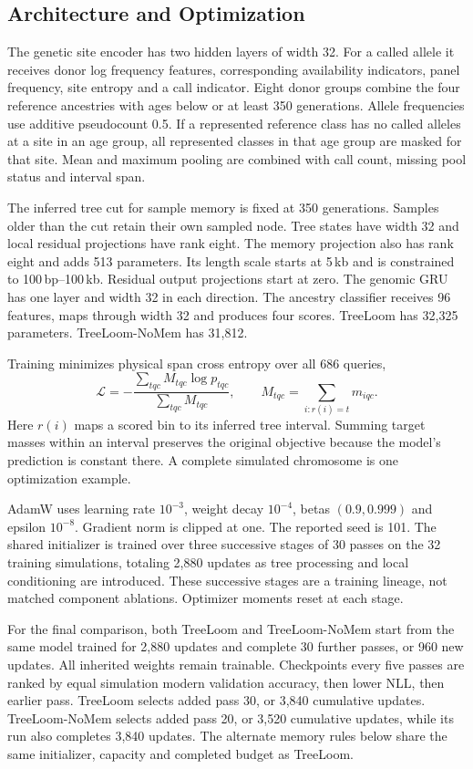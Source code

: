 \documentclass[letterpaper]{article}
\begin{document}
\subsection{Architecture and Optimization}
The genetic site encoder has two hidden layers of width 32. For a called allele it receives donor log frequency features, corresponding availability indicators, panel frequency, site entropy and a call indicator. Eight donor groups combine the four reference ancestries with ages below or at least 350 generations. Allele frequencies use additive pseudocount 0.5. If a represented reference class has no called alleles at a site in an age group, all represented classes in that age group are masked for that site. Mean and maximum pooling are combined with call count, missing pool status and interval span.

The inferred tree cut for sample memory is fixed at 350 generations. Samples older than the cut retain their own sampled node. Tree states have width 32 and local residual projections have rank eight. The memory projection also has rank eight and adds 513 parameters. Its length scale starts at 5\,kb and is constrained to 100\,bp--100\,kb. Residual output projections start at zero. The genomic GRU has one layer and width 32 in each direction. The ancestry classifier receives 96 features, maps through width 32 and produces four scores. TreeLoom has 32,325 parameters. TreeLoom-NoMem has 31,812.

Training minimizes physical span cross entropy over all 686 queries,
\begin{equation}
\mathcal L=
-\frac{\sum_{tqc}M_{tqc}\log p_{tqc}}{\sum_{tqc}M_{tqc}},
\qquad
M_{tqc}=\sum_{i:r(i)=t}m_{iqc}.
\end{equation}
Here $r(i)$ maps a scored bin to its inferred tree interval. Summing target masses within an interval preserves the original objective because the model's prediction is constant there. A complete simulated chromosome is one optimization example.

AdamW uses learning rate $10^{-3}$, weight decay $10^{-4}$, betas $(0.9,0.999)$ and epsilon $10^{-8}$. Gradient norm is clipped at one. The reported seed is 101. The shared initializer is trained over three successive stages of 30 passes on the 32 training simulations, totaling 2,880 updates as tree processing and local conditioning are introduced. These successive stages are a training lineage, not matched component ablations. Optimizer moments reset at each stage.

For the final comparison, both TreeLoom and TreeLoom-NoMem start from the same model trained for 2,880 updates and complete 30 further passes, or 960 new updates. All inherited weights remain trainable. Checkpoints every five passes are ranked by equal simulation modern validation accuracy, then lower NLL, then earlier pass. TreeLoom selects added pass 30, or 3,840 cumulative updates. TreeLoom-NoMem selects added pass 20, or 3,520 cumulative updates, while its run also completes 3,840 updates. The alternate memory rules below share the same initializer, capacity and completed budget as TreeLoom.
\end{document}
